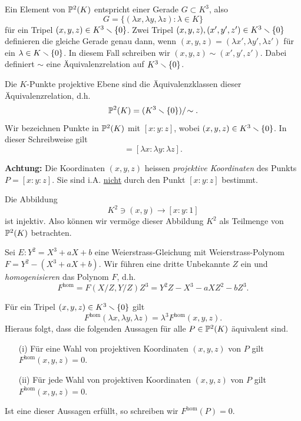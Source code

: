 \begin{bemerkung}
  Ein Element von ${\mathbb{P}}^2(K)$ entspricht einer Gerade $G\subset K^3$,
  also
  $$ G = \{ (\lambda x,\lambda y,\lambda z) : \lambda\in K\}$$
  für ein Tripel $(x,y,z)\in K^3\smallsetminus\{0\}$. Zwei Tripel
  $(x,y,z),(x',y',z')\in K^3\smallsetminus\{0\}$ definieren die gleiche Gerade
  genau dann, wenn
  $(x,y,z)=(\lambda x',\lambda y',\lambda z')$ für ein $\lambda\in
  K\smallsetminus\{0\}$.
  In diesem Fall schreiben wir $(x,y,z)\sim (x',y',z')$. Dabei
  definiert $\sim$ eine Äquivalenzrelation auf $K^3\smallsetminus\{0\}$.

  Die $K$-Punkte projektive Ebene sind die Äquivalenzklassen dieser
  Äquivalenzrelation, d.h. 
  \begin{equation*}
    {\mathbb{P}}^2(K) = (K^3\smallsetminus\{0\})/\!\sim.
  \end{equation*}
  Wir bezeichnen Punkte in ${\mathbb{P}}^2(K)$ mit $[x:y:z]$, wobei $(x,y,z)\in
  K^3\smallsetminus\{0\}$. In dieser Schreibweise gilt
  \begin{equation*}
    [x:y:z] = [\lambda x : \lambda y : \lambda z]. 
  \end{equation*}

  \textbf{Achtung:} Die Koordinaten $(x,y,z)$ heissen \emph{projektive
    Koordinaten} des Punkts $P=[x:y:z]$. Sie sind i.A.
  \underline{nicht} durch den Punkt $[x:y:z]$ bestimmt.

  Die Abbildung
  \begin{equation}
    \label{eq:affinechart}
    K^2\ni (x,y)\rightarrow [x:y:1] 
  \end{equation}
  ist injektiv. Also
  können wir vermöge dieser Abbildung $K^2$ als Teilmenge von
  ${\mathbb{P}}^2(K)$ betrachten. 
\end{bemerkung}


Sei $E: Y^2 = X^3+aX+b$ eine Weierstrass-Gleichung mit
Weierstrass-Polynom $F = Y^2 - (X^3+aX+b)$. Wir führen eine dritte
Unbekannte $Z$ ein und \emph{homogenisieren} das Polynom $F$, d.h.
\begin{equation}
  \label{eq:homogenisierung}
  F^{\mathrm{hom}} = F(X/Z,Y/Z)Z^3 = Y^2Z - X^3 - aXZ^2 -bZ^3.
\end{equation}

Für ein Tripel $(x,y,z)\in K^3\smallsetminus\{0\}$ gilt
$$F^{\mathrm{hom}}(\lambda x,\lambda y,\lambda z)
=\lambda^3F^{\mathrm{hom}}(x,y,z).$$
Hieraus folgt, dass die folgenden Aussagen für alle $P\in {\mathbb{P}}^2(K)$
äquivalent  sind.
\begin{enumerate}
\item [(i)] Für eine Wahl von projektiven Koordinaten $(x,y,z)$ von
  $P$ gilt $  F^{\mathrm{hom}}(x,y,z) = 0$.
\item [(ii)] Für jede Wahl von projektiven Koordinaten $(x,y,z)$ von
  $P$ gilt $  F^{\mathrm{hom}}(x,y,z) = 0$.
\end{enumerate}
Ist eine dieser Aussagen erfüllt, so schreiben wir
$F^{\mathrm{hom}}(P)=0$. 

